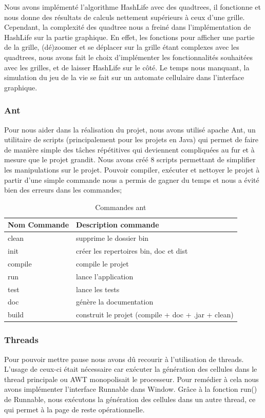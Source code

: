 \documentclass[12pt]{article}
\begin{document}
			Nous avons implémenté l’algorithme HashLife avec des quadtrees, il fonctionne et nous donne des résultats de calculs nettement supérieurs à ceux d’une grille. Cependant, la complexité des quadtree nous a freiné dans l’implémentation de HashLife sur la partie graphique. En effet, les fonctions pour afficher une partie de la grille, (dé)zoomer et se déplacer sur la grille étant complexes avec les quadtrees, nous avons fait le choix d’implémenter les fonctionnalités souhaitées avec les grilles, et de laisser HashLife sur le côté. Le temps nous manquant, la simulation du jeu de la vie se fait sur un automate cellulaire dans l’interface graphique.
			
			
			\subsubsection{Ant}
			Pour nous aider dans la réalisation du projet, nous avons utilisé apache Ant, un utilitaire de scripts (principalement pour les projets en Java) qui permet de faire de manière simple des tâches répétitives qui deviennent compliquées au fur et à mesure que le projet grandit. Nous avons créé 8 scripts permettant de simplifier les manipulations sur le projet. Pouvoir compiler, exécuter et nettoyer le projet à partir d'une simple commande nous a permis de gagner du temps et nous a évité bien des erreurs dans les commandes;
			\begin{table}[!htpb]
				\center
				\begin{tabular}{|l|l|}
					\hline
					Nom Commande & Description commande \\
					\hline
					clean & supprime le dossier bin \\
					\hline
					init & créer les repertoires bin, doc et dist \\
					\hline
					compile & compile le projet \\
					\hline
					run & lance l'application \\
					\hline
					test & lance les tests \\
					\hline
					doc & génère la documentation \\
					\hline
					build & construit le projet (compile + doc + .jar + clean) \\
					\hline
				\end{tabular}
				\caption{Commandes ant}
				\label{tab1}
			\end{table}
			
			\subsubsection{Threads}
			Pour pouvoir mettre pause nous avons dû recourir à l’utilisation de threads. L’usage de ceux-ci était nécessaire car exécuter la génération des cellules dans le thread principale ou AWT monopolisait le processeur. Pour remédier à cela nous avons implémenter l’interface Runnable dans Window. Grâce à la fonction run() de Runnable, nous exécutons la génération des cellules dans un autre thread, ce qui permet à la page de reste opérationnelle. 
			
\end{document}
